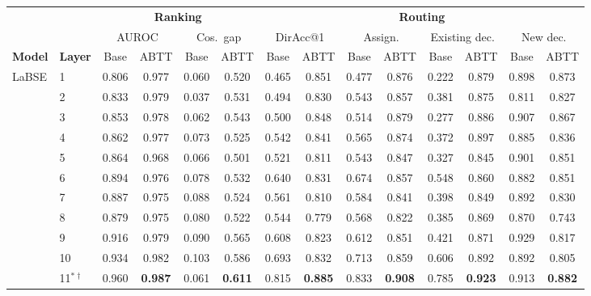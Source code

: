 \begin{table}[p]
\centering
\scriptsize
\setlength{\tabcolsep}{3pt}
\begin{tabular}{llcccccccccccc}
\toprule
\multicolumn{2}{c}{} & \multicolumn{4}{c}{\textbf{Ranking}} & \multicolumn{8}{c}{\textbf{Routing}} \\
\cmidrule(lr){3-6}\cmidrule(lr){7-14}
 &  & \multicolumn{2}{c}{AUROC} & \multicolumn{2}{c}{Cos.\ gap} & \multicolumn{2}{c}{DirAcc@1} & \multicolumn{2}{c}{Assign.} & \multicolumn{2}{c}{Existing dec.} & \multicolumn{2}{c}{New dec.} \\
\cmidrule(lr){3-4}\cmidrule(lr){5-6}\cmidrule(lr){7-8}\cmidrule(lr){9-10}\cmidrule(lr){11-12}\cmidrule(lr){13-14}
\textbf{Model} & \textbf{Layer} & Base & ABTT & Base & ABTT & Base & ABTT & Base & ABTT & Base & ABTT & Base & ABTT \\
\midrule
LaBSE & 1 & 0.806 & 0.977 & 0.060 & 0.520 & 0.465 & 0.851 & 0.477 & 0.876 & 0.222 & 0.879 & 0.898 & 0.873 \\
 & 2 & 0.833 & 0.979 & 0.037 & 0.531 & 0.494 & 0.830 & 0.543 & 0.857 & 0.381 & 0.875 & 0.811 & 0.827 \\
 & 3 & 0.853 & 0.978 & 0.062 & 0.543 & 0.500 & 0.848 & 0.514 & 0.879 & 0.277 & 0.886 & 0.907 & 0.867 \\
 & 4 & 0.862 & 0.977 & 0.073 & 0.525 & 0.542 & 0.841 & 0.565 & 0.874 & 0.372 & 0.897 & 0.885 & 0.836 \\
 & 5 & 0.864 & 0.968 & 0.066 & 0.501 & 0.521 & 0.811 & 0.543 & 0.847 & 0.327 & 0.845 & 0.901 & 0.851 \\
 & 6 & 0.894 & 0.976 & 0.078 & 0.532 & 0.640 & 0.831 & 0.674 & 0.857 & 0.548 & 0.860 & 0.882 & 0.851 \\
 & 7 & 0.887 & 0.975 & 0.088 & 0.524 & 0.561 & 0.810 & 0.584 & 0.841 & 0.398 & 0.849 & 0.892 & 0.830 \\
 & 8 & 0.879 & 0.975 & 0.080 & 0.522 & 0.544 & 0.779 & 0.568 & 0.822 & 0.385 & 0.869 & 0.870 & 0.743 \\
 & 9 & 0.916 & 0.979 & 0.090 & 0.565 & 0.608 & 0.823 & 0.612 & 0.851 & 0.421 & 0.871 & 0.929 & 0.817 \\
 & 10 & 0.934 & 0.982 & 0.103 & 0.586 & 0.693 & 0.832 & 0.713 & 0.859 & 0.606 & 0.892 & 0.892 & 0.805 \\
 & 11$^{\ast\dagger}$ & 0.960 & \textbf{0.987} & 0.061 & \textbf{0.611} & 0.815 & \textbf{0.885} & 0.833 & \textbf{0.908} & 0.785 & \textbf{0.923} & 0.913 & \textbf{0.882} \\

\end{tabular}
\end{table}
